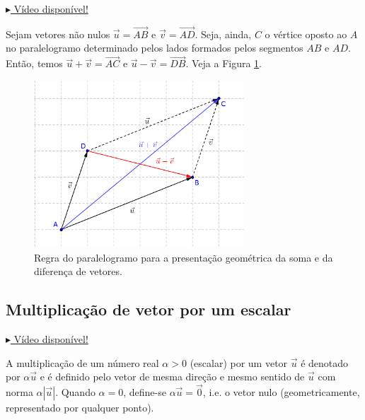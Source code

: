 \begin{obs}
  \begin{flushright}
    \href{https://archive.org/details/regra-do-paralelogramo}{$\blacktriangleright$ Vídeo disponível!}
  \end{flushright}

  Sejam vetores não nulos $\vec{u} = \overrightarrow{AB}$ e $\vec{v} = \overrightarrow{AD}$. Seja, ainda, $C$ o vértice oposto ao $A$ no paralelogramo determinado pelos lados formados pelos segmentos $AB$ e $AD$. Então, temos $\vec{u} + \vec{v} = \overrightarrow{AC}$ e $\vec{u}-\vec{v} = \overrightarrow{DB}$. Veja a Figura \ref{fig:regrapara}.

\begin{figure}[H]
  \centering
  \includegraphics[width=0.7\textwidth]{./cap_vetor/dados/fig_regrapara/fig_regrapara}
  \caption{Regra do paralelogramo para a presentação geométrica da soma e da diferença de vetores.}
  \label{fig:regrapara}
\end{figure}  
\end{obs}

\subsection{Multiplicação de vetor por um escalar}

\begin{flushright}
  \href{https://archive.org/details/multiplicacao-vetor-por-escalar}{$\blacktriangleright$ Vídeo disponível!}
\end{flushright}

A multiplicação de um número real $\alpha>0$ (escalar) por um vetor $\vec{u}$ é denotado por $\alpha\vec{u}$ e é definido pelo vetor de mesma direção e mesmo sentido de $\vec{u}$ com norma $\alpha|\vec{u}|$. Quando $\alpha = 0$, define-se $\alpha\vec{u}=\vec{0}$, i.e. o vetor nulo (geometricamente, representado por qualquer ponto).

